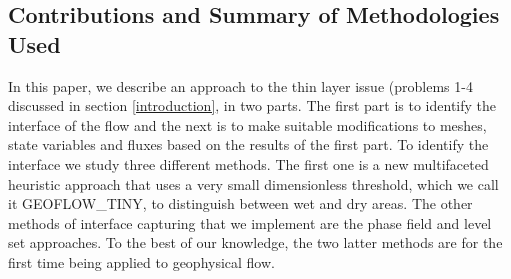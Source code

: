 \documentclass[review]{elsarticle}
\begin{document}
\subsection{Contributions and Summary of  Methodologies Used}
In this paper, we describe an approach to the thin layer issue (problems 1-4 discussed in section \ref{introduction}, in two parts. 
The first part is to identify the interface of the 
flow and the next is to make suitable modifications to meshes, state variables and fluxes based on the results of the first part.
To identify the interface we study three different methods. The first one is a new multifaceted heuristic approach that uses a very small dimensionless threshold, which we call it GEOFLOW\_TINY, to 
distinguish between wet and dry areas. The other methods of interface capturing that we implement are the phase field and level set approaches.
To the best of our knowledge, the two latter methods are for the first time being applied to geophysical flow. 
\end{document}
